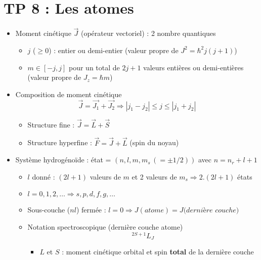 
\section*{TP 8 : Les atomes}
\begin{itemize}
	\item Moment cinétique $\vec{J}$ (opérateur vectoriel) : 2 nombre quantiques
	      \begin{itemize}
	      	\item $j$ ($\geq 0$) : entier ou demi-entier (valeur propre de $J^2 = \hbar ^2 j(j+1)$)
	      	\item $m \in [-j,j]$ pour un total de $2j +1$ valeurs entières ou demi-entières (valeur propre de $J_z = \hbar m$)
	      \end{itemize}
	      		
	\item Composition de moment cinétique
	      \begin{equation}
	      	\vec{J} = \vec{J_1}+\vec{J_2} \Rightarrow |j_1-j_2| \leq j \leq |j_1+j_2|
	      \end{equation}
	      \begin{itemize}
	      	\item Structure fine : $\vec{J}=\vec{L}+\vec{S}$
	      	\item Structure hyperfine : $\vec{F} = \vec{J}+\vec{L}$ (spin du noyau)
	      \end{itemize}
	      	
	\item Système hydrogénoïde : état = $(n,l,m,m_s \, (= \pm 1/2))$ avec $n = n_r+l+1$
	      \begin{itemize}
	      	\item $l$ donné : $(2l+1)$ valeurs de $m$ et 2 valeurs de $m_s \Rightarrow 2.(2l+1)$ états
	      	      		
	      	\item $l = 0,1,2, \dots \Rightarrow s,p,d,f,g,\dots$
	      	      		
	      	\item Sous-couche ($nl$) fermée : $l = 0 \Rightarrow J(atome) = J(dernière$ $couche)$
	      	      		
	      	\item Notation spectroscopique (dernière couche atome)
	      	      \begin{equation}
	      	      	^{2S+1}L_J
	      	      \end{equation}
	      	      \begin{itemize}
	      	      	\item $L$ et $S$ : moment cinétique orbital et spin \textbf{total} de la dernière couche
	      	      	      			

\end{itemize}
\end{itemize}
\end{itemize}
